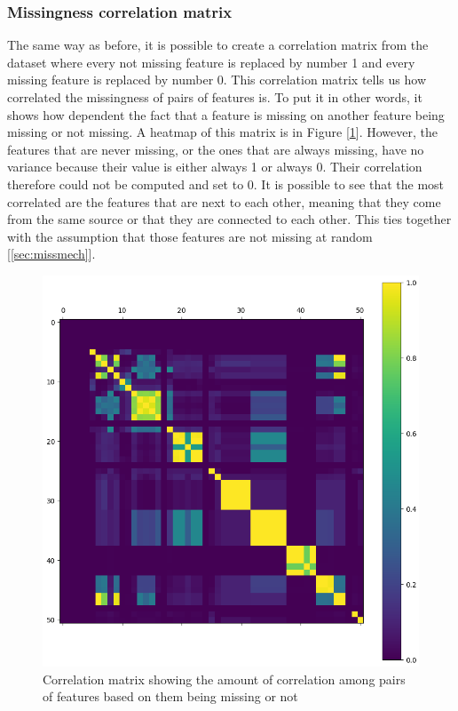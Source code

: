 \documentclass[11pt]{article}
\begin{document}
      \subsubsection{Missingness correlation matrix}
        The same way as before, it is possible to create a correlation matrix from the dataset where every not missing feature is replaced by number 1 and every missing feature is replaced by number 0. This correlation matrix tells us how correlated the missingness of pairs of features is. To put it in other words, it shows how dependent the fact that a feature is missing on another feature being missing or not missing. A heatmap of this matrix is in Figure [\ref{figure:missingness_matrix}]. However, the features that are never missing, or the ones that are always missing, have no variance because their value is either always 1 or always 0. Their correlation therefore could not be computed and set to 0. It is possible to see that the most correlated are the features that are next to each other, meaning that they come from the same source or that they are connected to each other. This ties together with the assumption that those features are not missing at random [\ref{sec:missmech}].
        \begin{figure}
          \centering
          \includegraphics[scale=0.4]{thesis_res/miss/heatmap_cropped.png}
          \caption{Correlation matrix showing the amount of correlation among pairs of features based on them being missing or not}
          \label{figure:missingness_matrix}
        \end{figure}
      \newpage
\end{document}
